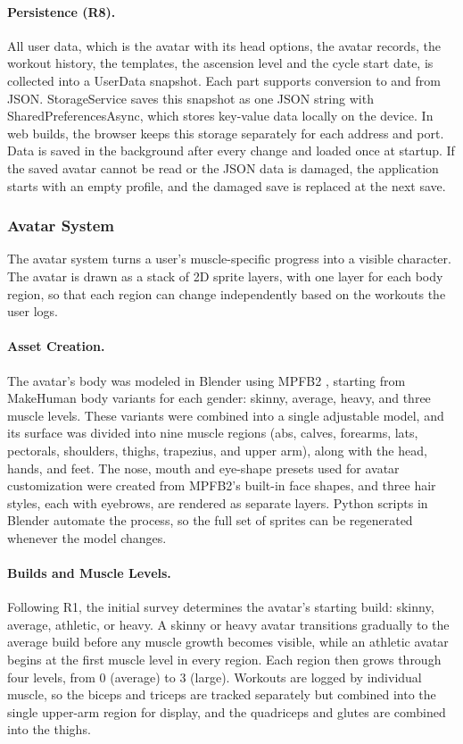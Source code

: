 \documentclass[11pt]{article}
\begin{document}
\paragraph{Persistence (R8).}
All user data, which is the avatar with its head options, the avatar records, the workout history, the templates,
the ascension level and the cycle start date, is collected into a UserData snapshot. Each part supports conversion to
and from JSON. StorageService saves this snapshot as one JSON string with SharedPreferencesAsync, which stores
key-value data locally on the device. In web builds, the browser keeps this storage separately for each address and
port. Data is saved in the background after every change and loaded once at startup. If the saved avatar cannot be
read or the JSON data is damaged, the application starts with an empty profile, and the damaged save is replaced at
the next save.

\subsubsection{Avatar System}
\label{sec:avatarsystem}

The avatar system turns a user's muscle-specific progress into a visible character. The avatar is drawn as a stack of 2D sprite layers, with one layer for each body region, so that each region can change independently based on the workouts the user logs.

\paragraph{Asset Creation.}
The avatar's body was modeled in Blender using MPFB2 \cite{blender, mpfb2}, starting from MakeHuman body variants for each gender: skinny, average, heavy, and three muscle levels. These variants were combined into a single adjustable model, and its surface was divided into nine muscle regions (abs, calves, forearms, lats, pectorals, shoulders, thighs, trapezius, and upper arm), along with the head, hands, and feet. The nose, mouth and eye-shape presets used for avatar customization were created from MPFB2's built-in face shapes, and three hair styles, each with eyebrows, are rendered as separate layers. Python scripts in Blender automate the process, so the full set of sprites can be regenerated whenever the model changes.

\paragraph{Builds and Muscle Levels.}
Following R1, the initial survey determines the avatar's starting build: skinny, average, athletic, or heavy. A skinny or heavy avatar transitions gradually to the average build before any muscle growth becomes visible, while an athletic avatar begins at the first muscle level in every region. Each region then grows through four levels, from 0 (average) to 3 (large). Workouts are logged by individual muscle, so the biceps and triceps are tracked separately but combined into the single upper-arm region for display, and the quadriceps and glutes are combined into the thighs.
\end{document}
